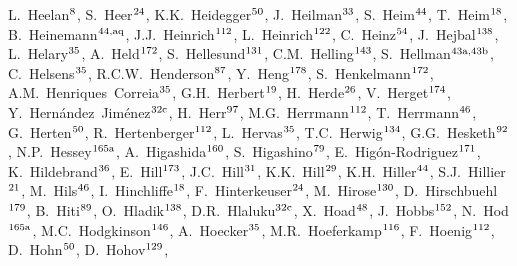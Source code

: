 \begin{flushleft}
L.~Heelan$^\textrm{\scriptsize 8}$,    
S.~Heer$^\textrm{\scriptsize 24}$,    
K.K.~Heidegger$^\textrm{\scriptsize 50}$,    
J.~Heilman$^\textrm{\scriptsize 33}$,    
S.~Heim$^\textrm{\scriptsize 44}$,    
T.~Heim$^\textrm{\scriptsize 18}$,    
B.~Heinemann$^\textrm{\scriptsize 44,aq}$,    
J.J.~Heinrich$^\textrm{\scriptsize 112}$,    
L.~Heinrich$^\textrm{\scriptsize 122}$,    
C.~Heinz$^\textrm{\scriptsize 54}$,    
J.~Hejbal$^\textrm{\scriptsize 138}$,    
L.~Helary$^\textrm{\scriptsize 35}$,    
A.~Held$^\textrm{\scriptsize 172}$,    
S.~Hellesund$^\textrm{\scriptsize 131}$,    
C.M.~Helling$^\textrm{\scriptsize 143}$,    
S.~Hellman$^\textrm{\scriptsize 43a,43b}$,    
C.~Helsens$^\textrm{\scriptsize 35}$,    
R.C.W.~Henderson$^\textrm{\scriptsize 87}$,    
Y.~Heng$^\textrm{\scriptsize 178}$,    
S.~Henkelmann$^\textrm{\scriptsize 172}$,    
A.M.~Henriques~Correia$^\textrm{\scriptsize 35}$,    
G.H.~Herbert$^\textrm{\scriptsize 19}$,    
H.~Herde$^\textrm{\scriptsize 26}$,    
V.~Herget$^\textrm{\scriptsize 174}$,    
Y.~Hern\'andez~Jim\'enez$^\textrm{\scriptsize 32c}$,    
H.~Herr$^\textrm{\scriptsize 97}$,    
M.G.~Herrmann$^\textrm{\scriptsize 112}$,    
T.~Herrmann$^\textrm{\scriptsize 46}$,    
G.~Herten$^\textrm{\scriptsize 50}$,    
R.~Hertenberger$^\textrm{\scriptsize 112}$,    
L.~Hervas$^\textrm{\scriptsize 35}$,    
T.C.~Herwig$^\textrm{\scriptsize 134}$,    
G.G.~Hesketh$^\textrm{\scriptsize 92}$,    
N.P.~Hessey$^\textrm{\scriptsize 165a}$,    
A.~Higashida$^\textrm{\scriptsize 160}$,    
S.~Higashino$^\textrm{\scriptsize 79}$,    
E.~Hig\'on-Rodriguez$^\textrm{\scriptsize 171}$,    
K.~Hildebrand$^\textrm{\scriptsize 36}$,    
E.~Hill$^\textrm{\scriptsize 173}$,    
J.C.~Hill$^\textrm{\scriptsize 31}$,    
K.K.~Hill$^\textrm{\scriptsize 29}$,    
K.H.~Hiller$^\textrm{\scriptsize 44}$,    
S.J.~Hillier$^\textrm{\scriptsize 21}$,    
M.~Hils$^\textrm{\scriptsize 46}$,    
I.~Hinchliffe$^\textrm{\scriptsize 18}$,    
F.~Hinterkeuser$^\textrm{\scriptsize 24}$,    
M.~Hirose$^\textrm{\scriptsize 130}$,    
D.~Hirschbuehl$^\textrm{\scriptsize 179}$,    
B.~Hiti$^\textrm{\scriptsize 89}$,    
O.~Hladik$^\textrm{\scriptsize 138}$,    
D.R.~Hlaluku$^\textrm{\scriptsize 32c}$,    
X.~Hoad$^\textrm{\scriptsize 48}$,    
J.~Hobbs$^\textrm{\scriptsize 152}$,    
N.~Hod$^\textrm{\scriptsize 165a}$,    
M.C.~Hodgkinson$^\textrm{\scriptsize 146}$,    
A.~Hoecker$^\textrm{\scriptsize 35}$,    
M.R.~Hoeferkamp$^\textrm{\scriptsize 116}$,    
F.~Hoenig$^\textrm{\scriptsize 112}$,    
D.~Hohn$^\textrm{\scriptsize 50}$,    
D.~Hohov$^\textrm{\scriptsize 129}$,    

\end{flushleft}
